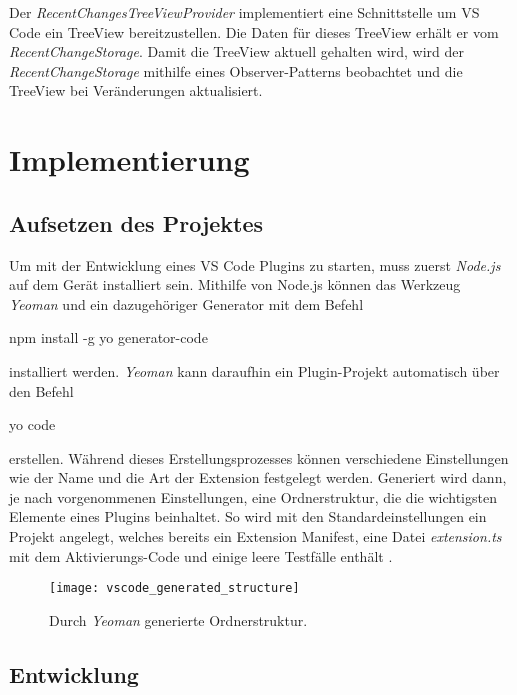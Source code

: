 Der \emph{RecentChangesTreeViewProvider} implementiert eine Schnittstelle
um VS Code ein TreeView bereitzustellen. Die Daten für dieses TreeView
erhält er vom \emph{RecentChangeStorage}. Damit die TreeView aktuell
gehalten wird, wird der \emph{RecentChangeStorage} mithilfe eines Observer-Patterns \cite{2005Dp:e}
beobachtet und die TreeView bei Veränderungen aktualisiert.


\section{Implementierung}
\label{sec:EntwicklungVsCode_Implementierung}

\subsection{Aufsetzen des Projektes}

Um mit der Entwicklung eines VS Code Plugins zu starten, muss zuerst \emph{Node.js} \cite{NodeJSWebsite}
auf dem Gerät installiert sein. Mithilfe von Node.js können das Werkzeug
\emph{Yeoman} \cite{YeomanWebsite} und ein dazugehöriger Generator mit dem Befehl
\begin{GenericCode}[numbers=none]
    npm install -g yo generator-code
\end{GenericCode}
installiert werden.
\emph{Yeoman} kann daraufhin ein Plugin-Projekt automatisch über den Befehl
\begin{GenericCode}[numbers=none]
    yo code
\end{GenericCode}
erstellen. Während dieses Erstellungsprozesses können verschiedene Einstellungen
wie der Name und die Art der Extension festgelegt werden. Generiert wird dann,
je nach vorgenommenen Einstellungen, eine Ordnerstruktur, die die wichtigsten
Elemente eines Plugins beinhaltet. So wird mit den Standardeinstellungen
ein Projekt angelegt, welches bereits ein Extension Manifest, eine Datei 
\emph{extension.ts} mit dem Aktivierungs-Code und einige leere Testfälle enthält
\cite{VSCodeExtensionAPIYourFirstExtension}.

\begin{figure}
    \centering
    \texttt{[image: vscode\_generated\_structure]}
    \caption{Durch \emph{Yeoman} generierte Ordnerstruktur.}
    \label{fig:vscode_generated_structure}
\end{figure}   

\subsection{Entwicklung}

